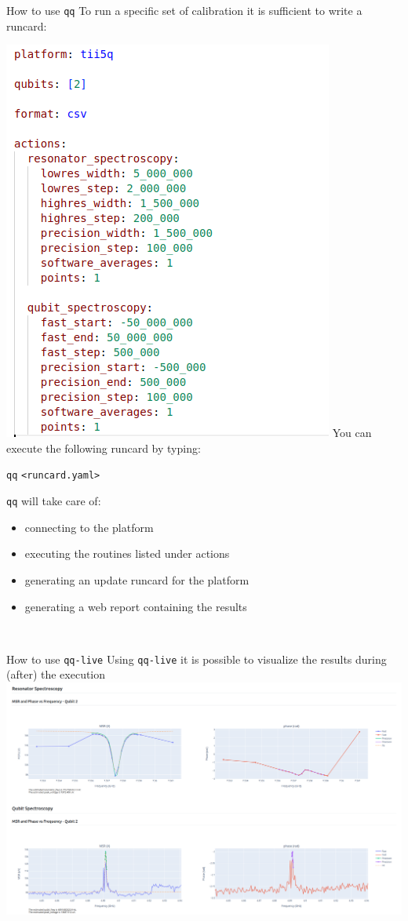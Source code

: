 \documentclass[11p,aspectratio=169]{beamer}
\begin{document}
\begin{frame}{How to use \texttt{qq}}
    To run a specific set of calibration it is sufficient to write a runcard:
    \begin{multicols*}{2}
        \includegraphics[width= 0.5 \textwidth]{figures/runcard.png}
        You can execute the following runcard by typing:
        \begin{center}
            \texttt{qq} \texttt{<runcard.yaml>} 
        \end{center}

    \texttt{qq} will take care of:
    \begin{itemize}
        \item connecting to the platform
        \item executing the routines listed under actions
        \item generating an update runcard for the platform
        \item generating a web report containing the results
    \end{itemize}
    \end{multicols*}
    \
\end{frame}

\begin{frame}{How to use \texttt{qq-live}}
    Using \texttt{qq-live} it is possible to visualize the results during (after) the execution
    \includegraphics[width=\textwidth]{figures/qq-live.png}
\end{frame}
\end{document}
